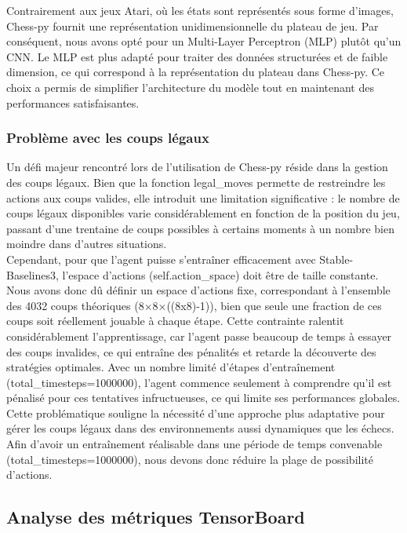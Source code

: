 \documentclass{article}
\begin{document}
    \quad Contrairement aux jeux Atari, où les états sont représentés sous forme d'images, Chess-py fournit une représentation unidimensionnelle du plateau de jeu. Par conséquent, nous avons opté pour un Multi-Layer Perceptron (MLP) plutôt qu'un CNN. Le MLP est plus adapté pour traiter des données structurées et de faible dimension, ce qui correspond à la représentation du plateau dans Chess-py. Ce choix a permis de simplifier l'architecture du modèle tout en maintenant des performances satisfaisantes.

    \subsubsection{Problème avec les coups légaux}

    \quad Un défi majeur rencontré lors de l'utilisation de Chess-py réside dans la gestion des coups légaux. Bien que la fonction legal\_moves permette de restreindre les actions aux coups valides, elle introduit une limitation significative : le nombre de coups légaux disponibles varie considérablement en fonction de la position du jeu, passant d'une trentaine de coups possibles à certains moments à un nombre bien moindre dans d'autres situations.\\

    Cependant, pour que l'agent puisse s'entraîner efficacement avec Stable-Baselines3, l'espace d'actions (self.action\_space) doit être de taille constante. Nous avons donc dû définir un espace d'actions fixe, correspondant à l'ensemble des 4032 coups théoriques (8×8×((8x8)-1)), bien que seule une fraction de ces coups soit réellement jouable à chaque étape. Cette contrainte ralentit considérablement l'apprentissage, car l'agent passe beaucoup de temps à essayer des coups invalides, ce qui entraîne des pénalités et retarde la découverte des stratégies optimales. Avec un nombre limité d'étapes d'entraînement (total\_timesteps=1000000), l'agent commence seulement à comprendre qu'il est pénalisé pour ces tentatives infructueuses, ce qui limite ses performances globales. Cette problématique souligne la nécessité d'une approche plus adaptative pour gérer les coups légaux dans des environnements aussi dynamiques que les échecs.\\
    
    Afin d'avoir un entraînement réalisable dans une période de temps convenable (total\_timesteps=1000000), nous devons donc réduire la plage de possibilité d’actions.


\subsection{Analyse des métriques TensorBoard}
\end{document}
